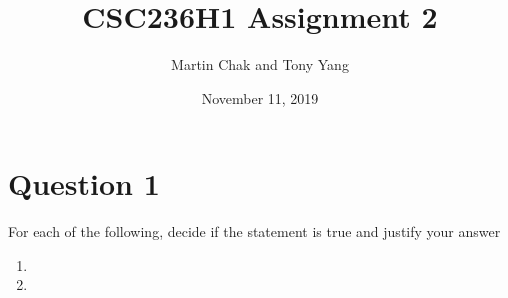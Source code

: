 \documentclass[20pt]{article}
\title{CSC236H1 Assignment 2}
\author{Martin Chak and Tony Yang}
\date{November 11, 2019}
\begin{document}

\maketitle


\newpage

\section*{Question 1}

\begin{text}
    For each of the following, decide if the statement is true and justify your answer
\end{text}

\begin{enumerate}[label=(\alph*),leftmargin=0cm]
    \item {}
    \item {}
\end{enumerate}
\end{document}
